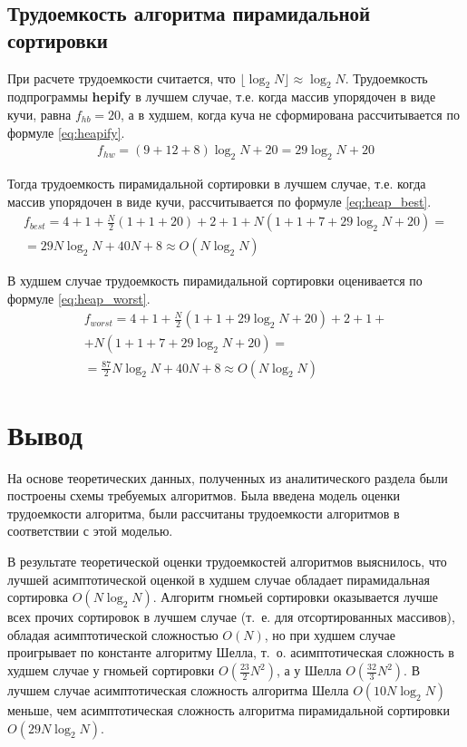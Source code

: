 \subsection{Трудоемкость алгоритма пирамидальной сортировки}
При расчете трудоемкости считается, что $\lfloor \log_{2}N \rfloor \approx \log_{2}N$.
Трудоемкость подпрограммы \textbf{hepify} в лучшем случае, т.е. когда массив упорядочен в виде кучи, равна $f_{hb} = 20$, а в худшем, когда куча не сформирована рассчитывается по формуле \eqref{eq:heapify}.
\begin{equation}
	\label{eq:heapify}
	\begin{gathered}
		f_{hw} = (9 + 12 + 8) \log_{2}N + 20 = 29 \log_{2}N + 20
	\end{gathered}
\end{equation}

Тогда трудоемкость пирамидальной сортировки в лучшем случае, т.е. когда массив упорядочен в виде кучи, рассчитывается по формуле \eqref{eq:heap_best}.
\begin{equation}
	\label{eq:heap_best}
	\begin{gathered}
		f_{best} = 4 + 1 + \frac{N}{2}(1 + 1 + 20) + 2 + 1 + N (1 + 1 + 7 + 29 \log_{2}N + 20) = \\
		= 29 N \log_{2}N + 40N + 8 \approx O(N \log_{2}N)
	\end{gathered}
\end{equation}

В худшем случае трудоемкость пирамидальной сортировки оценивается по формуле \eqref{eq:heap_worst}.
\begin{equation}
	\label{eq:heap_worst}
	\begin{gathered}
		f_{worst} = 4 + 1 + \frac{N}{2}(1 + 1 + 29 \log_{2}N + 20) + 2 + 1 +\\
		+ N (1 + 1 + 7 + 29 \log_{2}N + 20) = \\
		= \frac{87}{2} N \log_{2}N + 40N + 8 \approx O(N \log_{2}N)
	\end{gathered}
\end{equation}

\section*{Вывод}
На основе теоретических данных, полученных из аналитического раздела были построены схемы требуемых алгоритмов. 
Была введена модель оценки трудоемкости алгоритма, были рассчитаны трудоемкости алгоритмов в соответствии с этой моделью.

В результате теоретической оценки трудоемкостей алгоритмов выяснилось, что лучшей асимптотической оценкой в худшем случае обладает пирамидальная сортировка $O(N \log_{2}N)$. Алгоритм гномьей сортировки оказывается лучше всех прочих сортировок в лучшем случае (т.~е. для отсортированных массивов), обладая асимптотической сложностью $O(N)$, но при худшем случае проигрывает по константе алгоритму Шелла, т.~о. асимптотическая сложность в худшем случае у гномьей сортировки $O(\frac{23}{2}N^2)$, а у Шелла $O(\frac{32}{3} N ^ 2)$. В лучшем случае асимптотическая сложность алгоритма Шелла $O(10N\log_2N)$ меньше, чем асимптотическая сложность алгоритма пирамидальной сортировки $O(29N\log_2N)$.